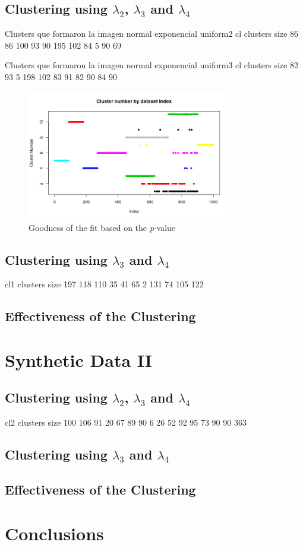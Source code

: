 \subsection{Clustering using $\lambda_{2}$, $\lambda_{3}$ and $\lambda_{4}$}

Clusters que formaron la imagen normal exponencial uniform2
cl clusters size
   86  86 100  93  90 195 102  84   5  90  69
 
Clusters que formaron la imagen normal exponencial uniform3 
 cl clusters size
   82  93   5 198 102  83  91  82  90  84  90

\begin{figure}[H]
    \centering
    \includegraphics[width=0.8\textwidth]{img/gld_clustering/Dataset1/l2_l3_l4/normal_exponential_uniform2.png}
    \caption{Goodness of the fit based on the \textit{p}-value}
    \label{fig:p_value}
\end{figure}

\subsection{Clustering using $\lambda_{3}$ and $\lambda_{4}$}

 cl1 clusters size
  197 118 110  35  41  65   2 131  74 105 122
 

\subsection{Effectiveness of the Clustering}

\section{Synthetic Data II}

\subsection{Clustering using $\lambda_{2}$, $\lambda_{3}$ and $\lambda_{4}$}
cl2 clusters size
  100 106  91  20  67  89  90   6  26  52  92  95  73  90  90 363

\subsection{Clustering using $\lambda_{3}$ and $\lambda_{4}$}

\subsection{Effectiveness of the Clustering}

\section{Conclusions}
